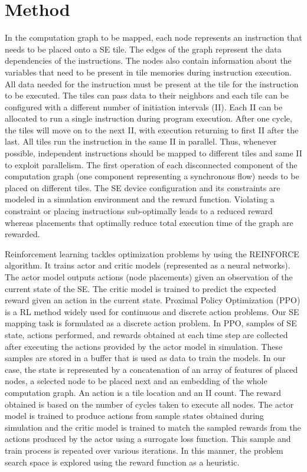 \documentclass[sigplan,screen]{acmart}
\begin{document}
\section{Method}
In the computation graph to be mapped, each node represents an instruction that needs to be placed onto a SE tile. 
The edges of the graph represent the data dependencies of the instructions. 
The nodes also contain information about the variables that need to be present in tile memories during instruction execution. 
All data needed for the instruction must be present at the tile for the instruction to be executed. 
The tiles can pass data to their neighbors and each tile can be configured with a different number of initiation intervals (II). 
Each II can be allocated to run a single instruction during program execution. 
After one cycle, the tiles will move on to the next II, with execution returning to first II after the last. 
All tiles run the instruction in the same II in parallel. 
Thus, whenever possible, independent instructions should be mapped to different tiles and same II to exploit parallelism. 
The first operation of each disconnected component of the computation graph (one component representing a synchronous flow) needs to be placed on different tiles. 
The SE device configuration and its constraints are modeled in a simulation environment and the reward function. 
Violating a constraint or placing instructions sub-optimally leads to a reduced reward whereas placements that optimally reduce total execution time of the graph are rewarded. 

Reinforcement learning tackles optimization problems by using the REINFORCE algorithm. 
It trains actor and critic models (represented as a neural networks). 
The actor model outputs actions (node placements) given an observation of the current state of the SE. 
The critic model is trained to predict the expected reward given an action in the current state. 
Proximal Policy Optimization (PPO) is a RL method widely used for continuous and discrete action problems. 
Our SE mapping task is formulated as a discrete action problem. 
In PPO, samples of SE state, actions performed, and rewards obtained at each time step are collected after executing the actions provided by the actor model in simulation. 
These samples are stored in a buffer that is used as data to train the models. In our case, the state is represented by a concatenation of an array of features of placed nodes, a selected node to be placed next and an embedding of the whole computation graph. An action is a tile location and an II count. The reward obtained is based on the number of cycles taken to execute all nodes. The actor model is trained to produce actions from sample states obtained during simulation and the critic model is trained to match the sampled rewards from the actions produced by the actor using a surrogate loss function. This sample and train process is repeated over various iterations. In this manner, the problem search space is explored using the reward function as a heuristic.  
\end{document}
